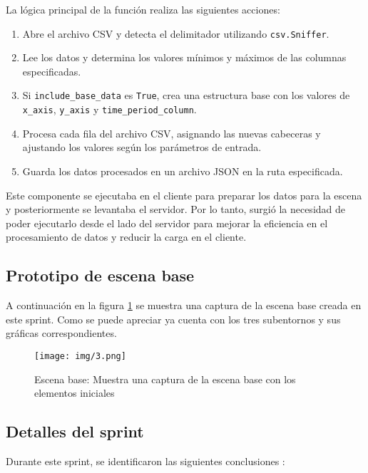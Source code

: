 \documentclass[a4paper, 12pt]{book}
\begin{document}
La lógica principal de la función realiza las siguientes acciones:

\begin{enumerate}
    \item Abre el archivo CSV y detecta el delimitador utilizando \texttt{csv.Sniffer}.
    \item Lee los datos y determina los valores mínimos y máximos de las columnas especificadas.
    \item Si \texttt{include\_base\_data} es \texttt{True}, crea una estructura base con los valores de \texttt{x\_axis}, \texttt{y\_axis} y \texttt{time\_period\_column}.
    \item Procesa cada fila del archivo CSV, asignando las nuevas cabeceras y ajustando los valores según los parámetros de entrada.
    \item Guarda los datos procesados en un archivo JSON en la ruta especificada.
\end{enumerate}    
        
        Este componente se ejecutaba en el cliente para preparar los datos para la escena y posteriormente se levantaba el servidor. Por lo tanto, surgió la necesidad de poder ejecutarlo desde el lado del servidor para mejorar la eficiencia en el procesamiento de datos y reducir la carga en el cliente.
            
        \subsection{Prototipo de escena base}
        A continuación en la figura \ref{fig:3} se muestra una captura de la escena base creada en este sprint. Como se puede apreciar ya cuenta con los tres subentornos y sus gráficas correspondientes.
\begin{figure}[H]
    \centering
    \texttt{[image: img/3.png]}
    \caption{Escena base: Muestra una captura de la escena base con los elementos iniciales}
    \label{fig:3}
\end{figure}
        \subsection{Detalles del sprint}

        Durante este sprint, se identificaron las siguientes conclusiones :
\end{document}
